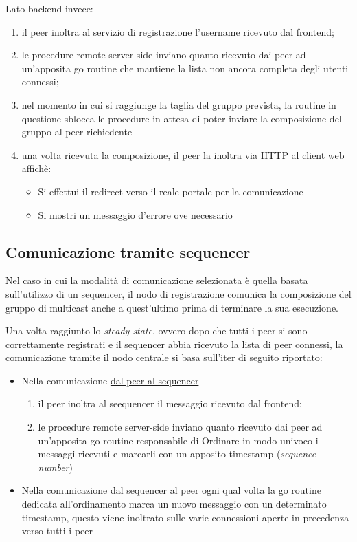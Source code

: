 \documentclass[conference]{IEEEtran}
\begin{document}
Lato backend invece:
\begin{enumerate}
\item il peer inoltra al servizio di registrazione l'username ricevuto dal frontend;
\item le procedure remote server-side inviano quanto ricevuto dai peer ad un'apposita go routine che mantiene la lista non ancora completa degli utenti connessi;
\item nel momento in cui si raggiunge la taglia del gruppo prevista, la routine in questione sblocca le procedure in attesa di poter inviare la composizione del gruppo al peer richiedente
\item una volta ricevuta la composizione, il peer la inoltra via HTTP al client web affichè:
\begin{itemize}
\item Si effettui il redirect verso il reale portale per la comunicazione
\item Si mostri un messaggio d'errore ove necessario
\end{itemize}
\end{enumerate}
\subsection{Comunicazione tramite sequencer}
Nel caso in cui la modalità di comunicazione selezionata è quella basata sull'utilizzo di un sequencer, il nodo di registrazione comunica la composizione del gruppo di multicast anche a quest'ultimo prima di terminare la sua esecuzione.

Una volta raggiunto lo \textit{steady state}, ovvero dopo che tutti i peer si sono correttamente registrati e il sequencer abbia ricevuto la lista di peer connessi, la comunicazione tramite il nodo centrale si basa sull'iter di seguito riportato:

\begin{itemize}
\item Nella comunicazione \ul{dal peer al sequencer}
\begin{enumerate}
\item il peer inoltra al seequencer il messaggio ricevuto dal frontend; 
\item le procedure remote server-side inviano quanto ricevuto dai peer ad un'apposita go routine responsabile di Ordinare in modo univoco i messaggi ricevuti e marcarli con un apposito timestamp (\textit{sequence number})
\end{enumerate}

\item Nella comunicazione \ul{dal sequencer al peer} ogni qual volta la go routine dedicata all'ordinamento marca un nuovo messaggio con un determinato timestamp, questo viene inoltrato sulle varie connessioni aperte in precedenza verso tutti i peer
\end{itemize}
\end{document}
